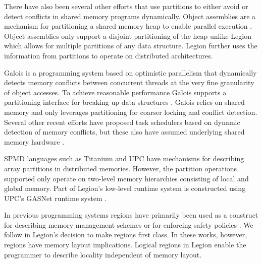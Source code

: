 There have also been several other efforts that use partitions to either avoid
or detect conflicts in shared memory programs dynamically.
Object assemblies are a mechanism for partitioning a shared memory
heap to enable parallel execution \cite{Lublinerman09}.  Object assemblies
only support a disjoint partitioning of the heap unlike Legion which
allows for multiple partitions of any data structure.  Legion further uses 
the information from partitions to operate on distributed architectures.

Galois is a programming system based on optimistic parallelism that dynamically detects 
memory conflicts between concurrent threads at the very
fine granularity of object accesses.  To achieve reasonable performance
Galois supports a partitioning interface for breaking up data structures \cite{Kulkarni08}.  
Galois relies on shared memory
and only leverages partitioning for coarser locking and conflict detection.
Several other recent efforts have proposed task schedulers
based on dynamic detection of memory conflicts, but these also have assumed
underlying shared memory hardware \cite{VTN11,Tzenakis12,EYJD12}.

SPMD languages such as Titanium \cite{TIT98} and UPC \cite{UPC99} have
mechanisms for describing array partitions in distributed memories.
However, the partition operations supported only operate on two-level
memory hierarchies consisting of local and global memory. 
Part of Legion's
low-level runtime system is constructed using UPC's GASNet
runtime system \cite{GASNET07}.

In previous programming systems regions have primarily been used as a construct for
describing memory management schemes \cite{REAPS02,RC01}  
or for enforcing safety policies \cite{CYCLONE01}.  We follow \cite{RC01} in Legion's
decision to make regions first class.  In these works, however, regions have
memory layout implications.  Logical regions in Legion enable the programmer to
describe locality independent of memory layout.


